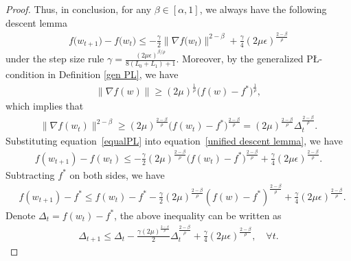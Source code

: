\documentclass[10pt]{article} %
\def\eqref#1{equation~\ref{#1}}
\newtheorem{proof}{Proof}
\begin{document}
\begin{proof}
Thus, in conclusion, for any $\beta \in [\alpha,1]$, we always have the following descent lemma
\begin{align}
    f\big(w_{t+1}\big)-f\big(w_t\big)\leq -\frac{\gamma}{2}\big\|\nabla f\big(w_t\big)\big\|^{2-\beta}+\frac{\gamma}{4} (2\mu\epsilon)^{\frac{2-\beta}{\rho}}
    \label{unified descent lemma}
\end{align}
under the step size rule $\gamma = \frac{(2\mu\epsilon)^{\beta/\rho}}{8(L_0+L_1)+1}$. Moreover, by the generalized P{\L}-condition in Definition \ref{gen PL}, we have
\begin{align}
    \big \|\nabla f(w) \big \| \geq (2\mu)^{\frac{1}{\rho}} \big(f(w)-f^*\big)^{\frac{1}{\rho}}, \nonumber
\end{align}
which implies that
\begin{align}
    \big \|\nabla f(w_t) \big \|^{2-\beta} \geq (2\mu)^{\frac{2-\beta}{\rho}} \big(f(w_t)-f^*\big)^{\frac{2-\beta}{\rho}} = (2\mu)^{\frac{2-\beta}{\rho}}\Delta_t^{\frac{2-\beta}{\rho}}.
    \label{equalPL}
\end{align}
Substituting \eqref{equalPL} into \eqref{unified descent lemma}, we have
\begin{align}
    f(w_{t+1}) - f(w_t) \leq -\frac{\gamma}{2}(2\mu)^{\frac{2-\beta}{\rho}}\big(f(w_{t}) - f^* \big)^{\frac{2-\beta}{\rho}} + \frac{\gamma}{4}(2\mu\epsilon)^{\frac{2-\beta}{\rho}}. \nonumber
\end{align}
Subtracting $f^*$ on both sides, we have 
\begin{align}
    &f(w_{t+1})-f^* \leq f(w_t) - f^* -\frac{\gamma}{2}(2\mu)^{\frac{2-\beta}{\rho}}(f(w)-f^*)^{\frac{2-\beta}{\rho}} + \frac{\gamma}{4}(2\mu\epsilon)^{\frac{2-\beta}{\rho}}. \nonumber
\end{align}
Denote $\Delta_t = f(w_t) - f^*$, the above inequality can be written as 
\begin{align}
    \Delta_{t+1} \leq \Delta_t- \frac{\gamma(2\mu)^{\frac{2-\beta}{\rho}}}{2}\Delta_t^{\frac{2-\beta}{\rho}}+\frac{\gamma}{4} (2\mu\epsilon)^{\frac{2-\beta}{\rho}}, \quad \forall t. 
    \label{descentPL}
\end{align}

\end{proof}
\end{document}
